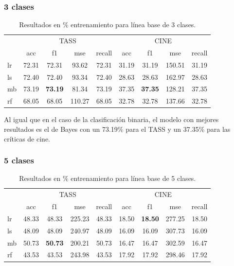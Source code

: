\subsubsection{3 clases}

\begin{table}[H]
	\centering
	\begin{tabular}{|l|cccc|cccc|}
		\hline
		& \multicolumn{4}{c|}{TASS} & \multicolumn{4}{c|}{CINE} \\
		\cline{2-9}
		&    acc &     f1 &    mse &  recall & acc &     f1 &    mse &  recall \\
		\hline
		lr      &  72.31 &  72.31 &   93.62 &   72.31 &  31.19 &  31.19 &  150.51 &   31.19 \\
		ls      &  72.40 &  72.40 &   93.34 &   72.40 &  28.63 &  28.63 &  162.97 &   28.63 \\
		mb      &  73.19 &  \textbf{73.19} &   81.34 &   73.19 &  37.35 &  \textbf{37.35} &  128.21 &   37.35 \\
		rf      &  68.05 &  68.05 &  110.27 &   68.05 &  32.78 &  32.78 &  137.66 &   32.78 \\
		\hline
	\end{tabular}
	\caption{Resultados en \% entrenamiento para línea base de 3 clases.}
	\label{result-línea-base-3-clases}
\end{table}

Al igual que en el caso de la clasificación binaria, el modelo con mejores resultados es el de Bayes con un 73.19\% para el TASS y un 37.35\% para las críticas de cine.

\subsubsection{5 clases}

\begin{table}[H]
	\centering
	\begin{tabular}{|l|cccc|cccc|}
		\hline
		& \multicolumn{4}{c|}{TASS} & \multicolumn{4}{c|}{CINE} \\
		\cline{2-9}
		&    acc &     f1 &    mse &  recall & acc &     f1 &    mse &  recall \\
		\hline
		lr      &  48.33 &  48.33 &  225.23 &   48.33 &  18.50 &  \textbf{18.50 }&  277.25 &   18.50 \\
		ls      &  48.09 &  48.09 &  240.97 &   48.09 &  16.09 &  16.09 &  307.73 &   16.09 \\
		mb      &  50.73 &  \textbf{50.73} &  200.21 &   50.73 &  16.47 &  16.47 &  302.59 &   16.47 \\
		rf      &  43.53 &  43.53 &  243.98 &   43.53 &  17.92 &  17.92 &  298.46 &   17.92 \\
		\hline
	\end{tabular}
	\caption{Resultados en \% entrenamiento para línea base de 5 clases.}
	\label{result-línea-base-5-clases}
\end{table}

